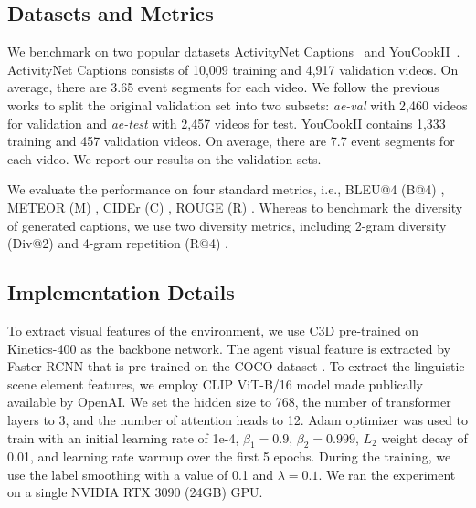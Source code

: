 \documentclass[letterpaper]{article} \usepackage{aaai23}  \usepackage{times}  \usepackage{helvet}  \usepackage{courier}  \usepackage[hyphens]{url}  \usepackage{graphicx} \urlstyle{rm} \def\UrlFont{\rm}  \usepackage{natbib}  \usepackage{caption} \frenchspacing  \setlength{\pdfpagewidth}{8.5in}  \setlength{\pdfpageheight}{11in}  \usepackage{algorithm}
\begin{document}
\subsection{Datasets and Metrics}

We benchmark \model on two popular datasets ActivityNet Captions~\cite{krishna2017dense} and YouCookII~\cite{zhou2018towards}. ActivityNet Captions consists of 10,009 training and 4,917 validation videos. On average, there are 3.65 event segments for each video. 
We follow the previous works \cite{lei2020mart} to split the original validation set into two subsets: \textit{ae-val} with 2,460 videos for validation and \textit{ae-test} with 2,457 videos for test. YouCookII contains 1,333 training and 457 validation videos. 
On average, there are 7.7 event segments for each video. We report our results on the validation sets. 



We evaluate the performance on four standard metrics, i.e., BLEU@4 (B@4) \cite{papineni2002bleu}, METEOR (M) \cite{denkowski2014meteor}, CIDEr (C) \cite{vedantam2015cider}, ROUGE (R) \cite{lin2004rouge}. Whereas to benchmark the diversity of generated captions, we use two diversity metrics, including 2-gram diversity (Div@2) \cite{div} and 4-gram repetition (R@4) \cite{xiong2018move}. 


\subsection{Implementation Details}
To extract visual features of the environment, we use C3D \cite{C3D} pre-trained on Kinetics-400 \cite{Kinetics} as the backbone network. The agent visual feature is extracted by Faster-RCNN \cite{FasterRCNN} that is pre-trained on the COCO dataset \cite{cocodataset}. To extract the linguistic scene element features, we employ CLIP \cite{radford2021learning} ViT-B/16 model made publically available by OpenAI.
We set the hidden size to 768, the number
of transformer layers to 3, and the number of attention heads to 12.
Adam optimizer was used to train \model with an initial learning rate of 1e-4, $\beta_1=0.9$, $\beta_2=0.999$, $L_2$ weight decay of 0.01, and learning rate warmup over the first 5 epochs. During the training, we use the label smoothing with a value of 0.1 and $\lambda=0.1$. We ran the experiment on a single NVIDIA RTX 3090 (24GB) GPU. 
\end{document}
